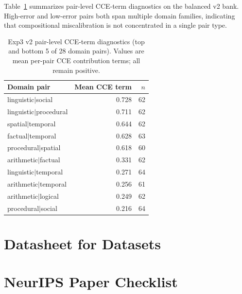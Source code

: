 \documentclass[10pt]{article}
\begin{document}
Table~\ref{tab:exp3-pair-contrib} summarizes pair-level CCE-term diagnostics on
the balanced v2 bank. High-error and low-error pairs both span multiple domain
families, indicating that compositional miscalibration is not concentrated in a
single pair type.

\begin{table}[h]
\centering
\caption{Exp3 v2 pair-level CCE-term diagnostics (top and bottom 5 of 28 domain pairs). Values are mean per-pair CCE contribution terms; all remain positive.}
\label{tab:exp3-pair-contrib}
\small
\begin{tabular}{lrr}
\toprule
Domain pair & Mean CCE term & $n$ \\
\midrule
linguistic$\vert$social & 0.728 & 62 \\
linguistic$\vert$procedural & 0.711 & 62 \\
spatial$\vert$temporal & 0.644 & 62 \\
factual$\vert$temporal & 0.628 & 63 \\
procedural$\vert$spatial & 0.618 & 60 \\
\midrule
arithmetic$\vert$factual & 0.331 & 62 \\
linguistic$\vert$temporal & 0.271 & 64 \\
arithmetic$\vert$temporal & 0.256 & 61 \\
arithmetic$\vert$logical & 0.249 & 62 \\
procedural$\vert$social & 0.216 & 64 \\
\bottomrule
\end{tabular}
\end{table}

\section{Datasheet for Datasets}
\label{app:datasheet}



\newpage
\section*{NeurIPS Paper Checklist}
\end{document}
